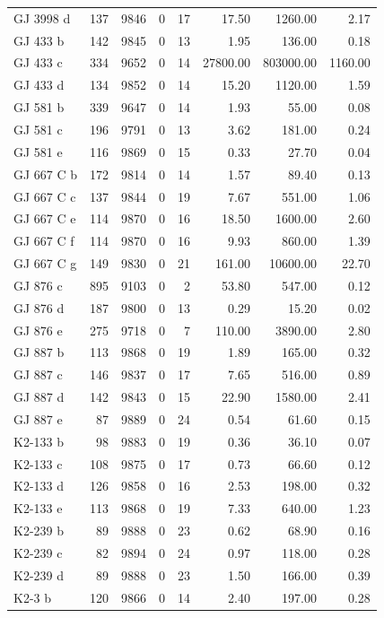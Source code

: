 \begin{table}
\begin{tabular}{lrrrrrrr}
GJ 3998 d & 137 & 9846 & 0 & 17 & 17.50 & 1260.00 & 2.17 \\
GJ 433 b & 142 & 9845 & 0 & 13 & 1.95 & 136.00 & 0.18 \\
GJ 433 c & 334 & 9652 & 0 & 14 & 27800.00 & 803000.00 & 1160.00 \\
GJ 433 d & 134 & 9852 & 0 & 14 & 15.20 & 1120.00 & 1.59 \\
GJ 581 b & 339 & 9647 & 0 & 14 & 1.93 & 55.00 & 0.08 \\
GJ 581 c & 196 & 9791 & 0 & 13 & 3.62 & 181.00 & 0.24 \\
GJ 581 e & 116 & 9869 & 0 & 15 & 0.33 & 27.70 & 0.04 \\
GJ 667 C b & 172 & 9814 & 0 & 14 & 1.57 & 89.40 & 0.13 \\
GJ 667 C c & 137 & 9844 & 0 & 19 & 7.67 & 551.00 & 1.06 \\
GJ 667 C e & 114 & 9870 & 0 & 16 & 18.50 & 1600.00 & 2.60 \\
GJ 667 C f & 114 & 9870 & 0 & 16 & 9.93 & 860.00 & 1.39 \\
GJ 667 C g & 149 & 9830 & 0 & 21 & 161.00 & 10600.00 & 22.70 \\
GJ 876 c & 895 & 9103 & 0 & 2 & 53.80 & 547.00 & 0.12 \\
GJ 876 d & 187 & 9800 & 0 & 13 & 0.29 & 15.20 & 0.02 \\
GJ 876 e & 275 & 9718 & 0 & 7 & 110.00 & 3890.00 & 2.80 \\
GJ 887 b & 113 & 9868 & 0 & 19 & 1.89 & 165.00 & 0.32 \\
GJ 887 c & 146 & 9837 & 0 & 17 & 7.65 & 516.00 & 0.89 \\
GJ 887 d & 142 & 9843 & 0 & 15 & 22.90 & 1580.00 & 2.41 \\
GJ 887 e & 87 & 9889 & 0 & 24 & 0.54 & 61.60 & 0.15 \\
K2-133 b & 98 & 9883 & 0 & 19 & 0.36 & 36.10 & 0.07 \\
K2-133 c & 108 & 9875 & 0 & 17 & 0.73 & 66.60 & 0.12 \\
K2-133 d & 126 & 9858 & 0 & 16 & 2.53 & 198.00 & 0.32 \\
K2-133 e & 113 & 9868 & 0 & 19 & 7.33 & 640.00 & 1.23 \\
K2-239 b & 89 & 9888 & 0 & 23 & 0.62 & 68.90 & 0.16 \\
K2-239 c & 82 & 9894 & 0 & 24 & 0.97 & 118.00 & 0.28 \\
K2-239 d & 89 & 9888 & 0 & 23 & 1.50 & 166.00 & 0.39 \\
K2-3 b & 120 & 9866 & 0 & 14 & 2.40 & 197.00 & 0.28 \\

\end{tabular}
\end{table}
